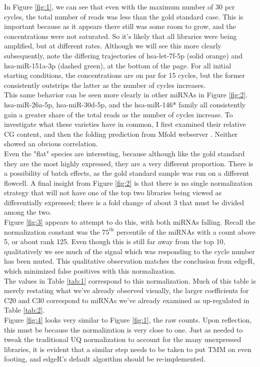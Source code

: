 \documentclass{bioinfo}
\begin{document}
In Figure \ref{fig:1}, we can see that even with the maximum number of 30 pcr cycles, the total number of reads was less than the gold standard case. This is important because as it appears there still was some room to grow, and the concentrations were not saturated. So it's likely that all libraries were being amplified, but at different rates. Although we will see this more clearly subsequently, note the differing trajectories of hsa-let-7f-5p (solid orange) and hsa-miR-151a-3p (dashed green), at the bottom of the page. For all initial starting conditions, the concentrations are on par for 15 cycles, but the former consistently outstrips the latter as the number of cycles increases. \vspace{4pt} \\
This same behavior can be seen more clearly in other miRNAs in Figure \ref{fig:2}. hsa-miR-26a-5p, hsa-miR-30d-5p, and the hsa-miR-146* family all consistently gain a greater share of the total reads as the number of cycles increase. To investigate what  these varieties have in common, I first examined their relative CG content, and then the folding prediction from Mfold webserver \citep{Zuker03}. Neither showed an obvious correlation.  \vspace{4pt} \\
Even the "flat" species are interesting, because although like the gold standard they are the most highly expressed, they are a very different proportion. There is a possibility of batch effects, as the gold standard sample was run on a different flowcell. A final insight from Figure \ref{fig:2} is that there is no single normalization strategy that will not have one of the top two libraries being viewed as differentially expressed; there is a fold change of about 3 that must be divided among the two.  \vspace{4pt} \\
Figure \ref{fig:3} appears to attempt to do this, with both miRNAs falling. Recall the normalization constant was the $75^{\text{th}}$ percentile of the miRNAs with a count above 5, or about rank 125. Even though this is still far away from the top 10, qualitatively we see much of the signal which was responding to the cycle number has been muted. This qualitative observation matches the conclusion from edgeR, which minimized false positives with this normalization. \vspace{4pt} \\
The values in Table \ref{tab:1} correspond to this normalization. Much of this table is merely restating what we've already observed visually, the larger coefficients for C20 and C30 correspond to miRNAs we've already examined as up-regulated in Table \ref{tab:2}. \vspace{4pt} \\
Figure \ref{fig:4} looks very similar to Figure \ref{fig:1}, the raw counts. Upon reflection, this must be because the normalization is very close to one. Just as \citep{Tam15} needed to tweak the traditional UQ normalization to account for the many unexpressed libraries, it is evident that a similar step needs to be taken to put TMM on even footing, and edgeR's default algorithm should be re-implemented. 
\end{document}
